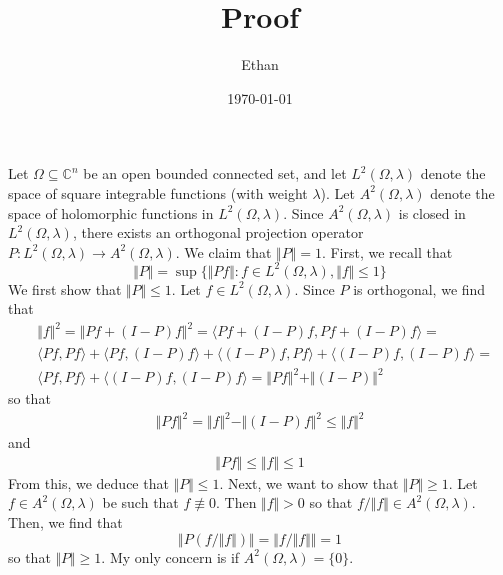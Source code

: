 \documentclass[12pt]{article}
\begin{document}
 
\title{Proof}
\author{Ethan}
\date{\today}
\maketitle
{}
\hfuzz=50pt
\noindent
Let $\Omega \subseteq \mathbb{C}^n$ be an open bounded connected set, and let $L^2(\Omega,\lambda)$ denote the space of square integrable functions (with weight $\lambda$). Let $A^2(\Omega, \lambda)$ denote the space of holomorphic functions in $L^2(\Omega,\lambda)$. Since $A^2(\Omega,\lambda)$ is closed in $L^2(\Omega,\lambda)$, there exists an orthogonal projection operator $P: L^2(\Omega,\lambda) \rightarrow A^2(\Omega,\lambda)$. We claim that $\Vert P \Vert = 1$. First, we recall that
\[
\Vert P \Vert = \sup\{\Vert Pf \Vert: f \in L^2(\Omega, \lambda), \Vert f \Vert \leq 1\}
\] We first show that $\Vert P \Vert \leq 1$. Let $f \in L^2(\Omega, \lambda)$. Since $P$ is orthogonal, we find that
\begin{align}
&\Vert f \Vert^2 = \Vert Pf + (I-P)f \Vert^2 = \langle Pf + (I-P)f, Pf + (I - P)f \rangle =\\
& \langle Pf, Pf \rangle + \langle Pf, (I-P)f \rangle + \langle (I-P)f, Pf \rangle + \langle (I-P)f, (I-P)f \rangle = \\
& \langle Pf, Pf \rangle + \langle (I-P)f, (I-P)f \rangle = \Vert Pf \Vert^2 + \Vert(I-P)\Vert^2
\end{align} so that
\begin{align}
\Vert Pf \Vert^2 = \Vert f \Vert^2 - \Vert (I-P)f \Vert^2 \leq \Vert f \Vert^2
\end{align} and
\begin{align}
\Vert Pf \Vert \leq \Vert f \Vert \leq 1
\end{align} From this, we deduce that $\Vert P \Vert \leq 1$. Next, we want to show that $\Vert P \Vert \geq 1$. Let $f \in A^2(\Omega,\lambda)$ be such that $f \not \equiv 0$. Then $\Vert f \Vert > 0$ so that $f/\Vert f \Vert \in A^2(\Omega,\lambda)$. Then, we find that
\[
\Vert P(f/\Vert f \Vert) \Vert = \Vert f/\Vert f\Vert \Vert = 1
\] so that $\Vert P \Vert \geq 1$. My only concern is if $A^2(\Omega,\lambda) = \{0\}$.
\end{document}

